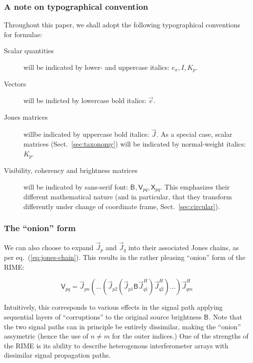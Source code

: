 \documentclass[]{aa}
\newcommand{\herm}{H}
\newcommand{\jones}[2]{\vec {#1}_{#2}}
\newcommand{\jonesT}[2]{\vec {#1}^{\herm}_{#2}}
\newcommand{\coh}[2]{\mathsf{{#1}}_{{#2}}}
\begin{document}
\subsubsection{A note on typographical convention}

Throughout this paper, we shall adopt the following typographical conventions for formulae:

\begin{description}
\item[Scalar quantities] will be indicated by lower- and uppercase italics: $e_x,I,K_p$.
\item[Vectors] will be indicted by lowercase bold italics: $\vec e$.
\item[Jones matrices] willbe indicated by uppercase bold italics: $\jones{J}{}$. As a special case, scalar matrices
(Sect.~\ref{sec:taxonomy}) will be indicated by normal-weight italics: $K_p$.
\item[Visibility, coherency and brightness matrices] will be indicated by sans-serif font: 
$\coh{B}{}, \coh{V}{pq}, \coh{X}{pq}$. This emphasizes their different mathematical nature (and in particular, that they transform differently under change of coordinate frame, Sect.~\ref{sec:circular}).
\end{description}


\subsubsection{The ``onion'' form}

We can also choose to expand $\jones{J}{p}$ and $\jones{J}{q}$ into their associated Jones chains, as per 
eq.~(\ref{eq:jones-chain}). This results in the rather pleasing ``onion'' form of the RIME:

    \begin{equation}\label{eq:me0-onion}
    \coh{V}{pq} = \jones{J}{pn}(...(\jones{J}{p2} (\jones{J}{p1} \coh{B}{}  \jones{J}{q1}^\herm)\jonesT{J}{q2}) ... )\jonesT{J}{qm}
    \end{equation}

Intuitively, this corresponds to various effects in the signal path applying sequential layers of ``corruptions'' to the original source brightness $\coh{B}{}$. Note that the two signal paths can in principle be entirely dissimilar, making the ``onion'' assymetric (hence the use of $n\ne m$ for the outer indices.) One of the strengths of the RIME is its ability to describe heterogenous interferometer arrays with dissimilar signal propagation paths.
\end{document}
